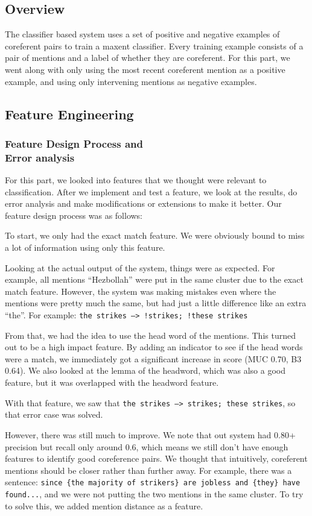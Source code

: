 \documentclass[12pt, twocolumn]{article}
\begin{document}
\subsection{Overview}
The classifier based system uses a set of positive and negative examples of coreferent pairs to train a maxent classifier. Every training example consists of a pair of mentions and a label of whether they are coreferent. For this part, we went along with only using the most recent coreferent mention as a positive example, and using only intervening mentions as negative examples. 
\subsection{Feature Engineering}
\subsubsection{Feature Design Process and\\ Error analysis}
For this part, we looked into features that we thought were relevant to classification. After we implement and test a feature, we look at the results, do error analysis and make modifications or extensions to make it better. Our feature design process was as follows:

To start, we only had the exact match feature. We were obviously bound to miss a lot of information using only this feature. 

Looking at the actual output of the system, things were as expected. For example, all mentions ``Hezbollah'' were put in the same cluster due to the exact match feature. However, the system was making mistakes even where the mentions were pretty much the same, but had just a little difference like an extra ``the''. For example: \texttt{{the strikes} -->  !{strikes}; !{these strikes}}

From that, we had the idea to use the head word of the mentions. This turned out to be a high impact feature. By adding an indicator to see if the head words were a match, we immediately got a significant increase in score (MUC 0.70, B3 0.64). We also looked at the lemma of the headword, which was also a good feature, but it was overlapped with the headword feature.

With that feature, we saw that \texttt{{the strikes} -->  {strikes}; {these strikes}}, so that error case was solved. 

However, there was still much to improve. We note that out system had 0.80+ precision but recall only around 0.6, which means we still don't have enough features to identify good coreference pairs. We thought that intuitively, coreferent mentions should be closer rather than further away. For example, there was a sentence: \texttt{since \{{the majority of strikers\}} are jobless and {\{they\}} have found...}, and we were not putting the two mentions in the same cluster. To try to solve this, we added mention distance as a feature.
\end{document}

